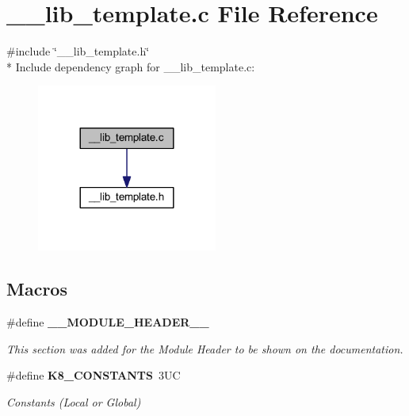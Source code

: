 \section{\-\_\-\-\_\-lib\-\_\-template.\-c File Reference}
\label{____lib__template_8c}
{\ttfamily \#include \char`\"{}\-\_\-\-\_\-lib\-\_\-template.\-h\char`\"{}}\\*
Include dependency graph for \-\_\-\-\_\-lib\-\_\-template.\-c\-:\nopagebreak
\begin{figure}[H]
\begin{center}
\leavevmode
\includegraphics[width=168pt]{____lib__template_8c__incl}
\end{center}
\end{figure}
\subsection*{Macros}
\begin{DoxyCompactItemize}
\item 
\#define {\bf \-\_\-\-\_\-\-M\-O\-D\-U\-L\-E\-\_\-\-H\-E\-A\-D\-E\-R\-\_\-\-\_\-}
\begin{DoxyCompactList}\small\item\em This section was added for the Module Header to be shown on the documentation. \end{DoxyCompactList}\item 
\#define {\bf K8\-\_\-\-C\-O\-N\-S\-T\-A\-N\-T\-S}~3\-U\-C
\begin{DoxyCompactList}\small\item\em Constants (Local or Global) \end{DoxyCompactList}\end{DoxyCompactItemize}
